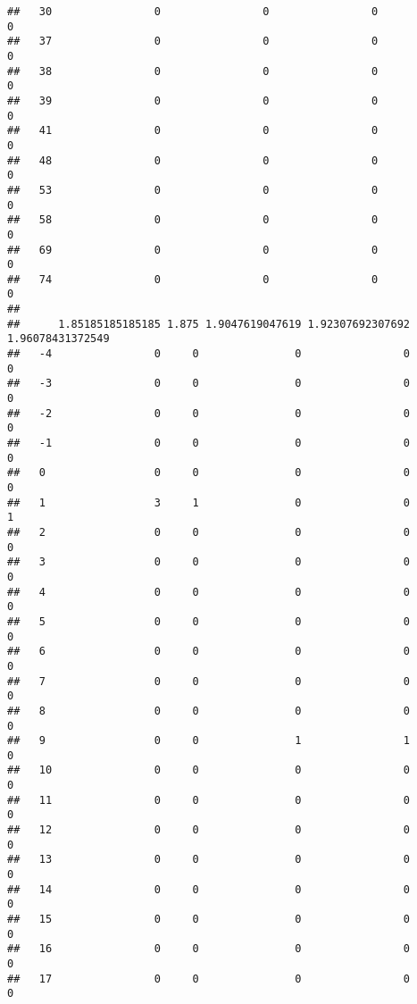 \documentclass[]{article}
\begin{document}
\begin{verbatim}
##   30                0                0                0               0
##   37                0                0                0               0
##   38                0                0                0               0
##   39                0                0                0               0
##   41                0                0                0               0
##   48                0                0                0               0
##   53                0                0                0               0
##   58                0                0                0               0
##   69                0                0                0               0
##   74                0                0                0               0
##     
##      1.85185185185185 1.875 1.9047619047619 1.92307692307692 1.96078431372549
##   -4                0     0               0                0                0
##   -3                0     0               0                0                0
##   -2                0     0               0                0                0
##   -1                0     0               0                0                0
##   0                 0     0               0                0                0
##   1                 3     1               0                0                1
##   2                 0     0               0                0                0
##   3                 0     0               0                0                0
##   4                 0     0               0                0                0
##   5                 0     0               0                0                0
##   6                 0     0               0                0                0
##   7                 0     0               0                0                0
##   8                 0     0               0                0                0
##   9                 0     0               1                1                0
##   10                0     0               0                0                0
##   11                0     0               0                0                0
##   12                0     0               0                0                0
##   13                0     0               0                0                0
##   14                0     0               0                0                0
##   15                0     0               0                0                0
##   16                0     0               0                0                0
##   17                0     0               0                0                0

\end{verbatim}
\end{document}
